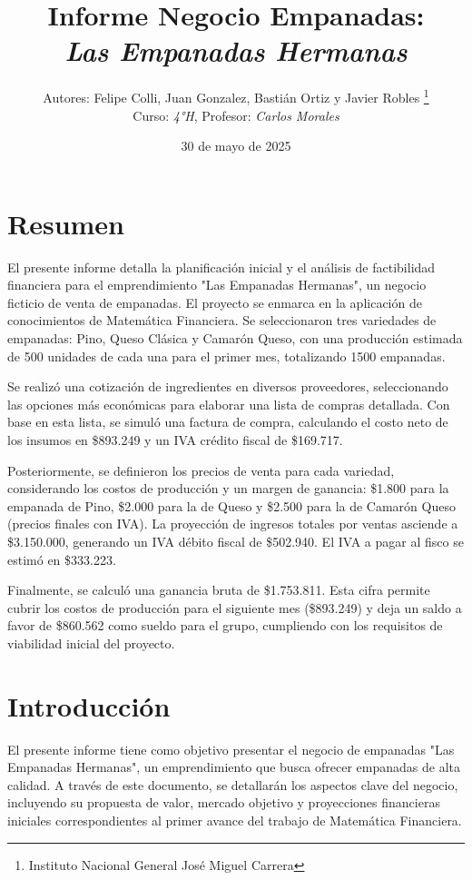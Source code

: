 \documentclass[12pt]{article}
\title{Informe Negocio Empanadas: \\
\textit{Las Empanadas Hermanas}} %
\author{Autores: Felipe Colli, Juan Gonzalez, Bastián Ortiz y Javier Robles \thanks{Instituto Nacional General José Miguel Carrera} \\
  Curso: \textit{4°H}, Profesor: \textit{Carlos Morales}} %
\date{30 de mayo de 2025} %
\begin{document}
\maketitle
\newpage

\tableofcontents
\newpage

\section{Resumen} %
El presente informe detalla la planificación inicial y el análisis de factibilidad financiera para el emprendimiento "Las Empanadas Hermanas", un negocio ficticio de venta de empanadas. El proyecto se enmarca en la aplicación de conocimientos de Matemática Financiera. Se seleccionaron tres variedades de empanadas: Pino, Queso Clásica y Camarón Queso, con una producción estimada de 500 unidades de cada una para el primer mes, totalizando 1500 empanadas.

Se realizó una cotización de ingredientes en diversos proveedores, seleccionando las opciones más económicas para elaborar una lista de compras detallada. Con base en esta lista, se simuló una factura de compra, calculando el costo neto de los insumos en \$893.249 y un IVA crédito fiscal de \$169.717.

Posteriormente, se definieron los precios de venta para cada variedad, considerando los costos de producción y un margen de ganancia: \$1.800 para la empanada de Pino, \$2.000 para la de Queso y \$2.500 para la de Camarón Queso (precios finales con IVA). La proyección de ingresos totales por ventas asciende a \$3.150.000, generando un IVA débito fiscal de \$502.940. El IVA a pagar al fisco se estimó en \$333.223.

Finalmente, se calculó una ganancia bruta de \$1.753.811. Esta cifra permite cubrir los costos de producción para el siguiente mes (\$893.249) y deja un saldo a favor de \$860.562 como sueldo para el grupo, cumpliendo con los requisitos de viabilidad inicial del proyecto.
\newpage



\section{Introducción} %
El presente informe tiene como objetivo presentar el negocio de empanadas "Las Empanadas Hermanas", un emprendimiento que busca ofrecer empanadas de alta calidad. A través de este documento, se detallarán los aspectos clave del negocio, incluyendo su propuesta de valor, mercado objetivo y proyecciones financieras iniciales correspondientes al primer avance del trabajo de Matemática Financiera. \\
\end{document}
